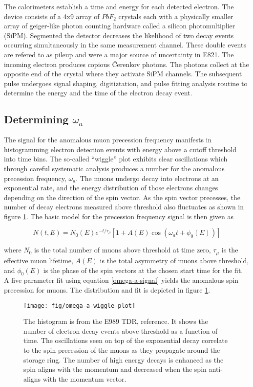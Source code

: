 The calorimeters establish a time and energy for each detected electron.  The device consists of a 4x9 array of $PbF_2$ crystals each with a physically smaller array of geiger-like photon counting hardware called a silicon photomultiplier (SiPM).  Segmented the detector decreases the likelihood of two decay events occurring simultaneously in the same measurement channel.  These double events are refered to as pileup and were a major source of uncertainty in E821.  The incoming electron produces copious \v{C}erenkov photons.  The photons collect at the opposite end of the crystal where they activate SiPM channels.  The subsequent pulse undergoes signal shaping, digitiztation, and pulse fitting analysis routine to determine the energy and the time of the electron decay event.  

\subsection{Determining $\omega_a$}

The signal for the anomalous muon precession frequency manifests in histogramming electron detection events with energy above a cutoff threshold into time bins. The so-called ``wiggle'' plot exhibits clear oscillations which through careful systematic analysis produces a number for the anomalous precession frequency, $\omega_a$.  The muons undergo decay into electrons at an exponential rate, and the energy distribution of those electrons changes depending on the direction of the spin vector.  As the spin vector precesses, the number of decay electrons measured above threshold also fluctuates as shown in figure \ref{fig:omega-a-wiggle-plot}.  The basic model for the precession frequency signal is then given as 

\begin{equation}
\label{eqn:omega-a-signal}
N(t, E) = N_0(E) e^{-t/\tau_\mu} \left[ 1 + A(E) \cos(\omega_a t + \phi_0(E))\right]
\end{equation}

where $N_0$ is the total number of muons above threshold at time zero, $\tau_\mu$ is the effective muon lifetime, $A(E)$ is the total asymmetry of muons above threshold, and $\phi_0(E)$ is the phase of the spin vectors at the chosen start time for the fit.  A five parameter fit using equation \ref{omega-a-signal} yields the anomalous spin precession for muons.  The distribution and fit is depicted in figure \ref{fig:omega-a-wiggle-plot}.

\begin{figure}
\texttt{[image: fig/omega-a-wiggle-plot]}
\caption{The histogram is from the E989 TDR, reference\cite{e989-tdr}.  It shows the number of electron decay events above threshold as a function of time.  The oscillations seen on top of the exponential decay correlate to the spin precession of the muons as they propagate around the storage ring.  The number of high energy decays is enhanced as the spin aligns with the momentum and decreased when the spin anti-aligns with the momentum vector. \label{fig:omega-a-wiggle-plot}}
\end{figure}
